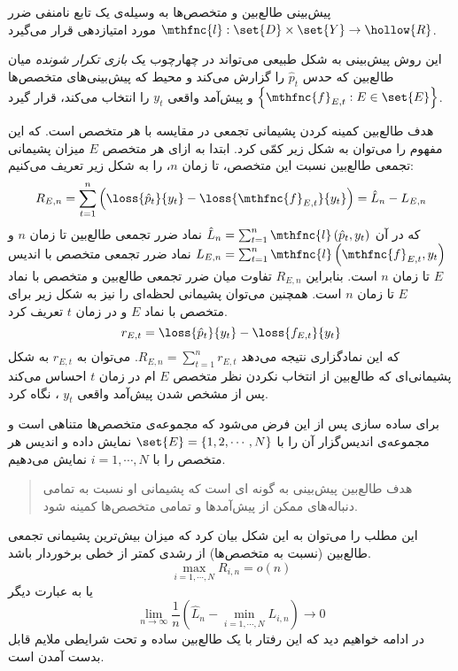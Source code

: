 
پیش‌بینی طالع‌بین و متخصص‌ها به وسیله‌ی یک تابع نامنفی ضرر
$\mthfnc{l} : \set{D} \times \set{Y} \rightarrow \hollow{R}$ 
مورد امتیازدهی قرار می‌گیرد.


این روش پیش‌بینی به شکل طبیعی می‌تواند در چهارچوب یک 
\textit{
بازی تکرار شونده
} 
میان طالع‌بین که حدس 
$\hat{p}_t$ 
را گزارش می‌کند و محیط که پیش‌بینی‌های متخصص‌ها 
$\left\lbrace \mthfnc{f}_{E,t} : E \in \set{E} \right\rbrace$ 
و پیش‌آمد واقعی 
$y_t$ 
را انتخاب می‌کند، قرار گیرد.


هدف طالع‌بین کمینه کردن پشیمانی تجمعی
در مقایسه با هر متخصص است. که این مفهوم را می‌توان به شکل زیر کمّی کرد. ابتدا به ازای هر متخصص 
$E$ 
میزان پشیمانی تجمعی طالع‌بین نسبت این متخصص، تا زمان 
$n$، 
را به شکل زیر تعریف می‌کنیم:
\[
R_{E,n} = \sum^{n}_{t = 1} \left( \loss{\hat{p}_t}{y_t} - \loss{\mthfnc{f}_{E,t}}{y_t} \right) = \hat{L}_n - L_{E,n}
\]
که در آن 
$\hat{L}_n = \sum^{n}_{t=1} \mthfnc{l} \left( \hat{p}_t, y_t \right)$ 
نماد ضرر تجمعی طالع‌بین تا زمان 
$n$ 
و 
$L_{E,n} = \sum^{n}_{t=1} \mthfnc{l} \left( \mthfnc{f}_{E,t}, y_t \right)$ 
نماد ضرر تجمعی متخصص با اندیس 
$E$ 
تا زمان 
$n$ 
است. بنابراین 
$R_{E,n}$ 
تفاوت میان ضرر تجمعی طالع‌بین و متخصص با نماد 
$E$ 
تا زمان 
$n$ 
است. همچنین می‌توان پشیمانی لحظه‌ای را نیز به شکل زیر برای متخصص با نماد 
$E$ 
و در زمان 
$t$ 
تعریف کرد.
\[
r_{E,t} = \loss{ \hat{p}_t }{ y_t } - \loss{ f_{E,t} }{ y_t }
\]
که این نمادگزاری نتیجه می‌دهد 
$R_{E,n} = \sum^{n}_{t=1} r_{E,t}$. 
می‌توان به 
$r_{E,t}$ 
به شکل پشیمانی‌ای که طالع‌بین از انتخاب نکردن نظر متخصص 
$E$
ام در زمان 
$t$ 
احساس می‌کند پس از مشخص شدن پیش‌آمد واقعی 
$y_t$ 
، نگاه کرد.


برای ساده سازی پس از این فرض می‌شود که مجموعه‌ی متخصص‌ها متناهی است و مجموعه‌ی اندیس‌گزار آن را با 
$\set{E} = \left\lbrace 1,2, \cdots, N \right\rbrace$ 
نمایش داده و اندیس هر متخصص را با 
$i = 1, \cdots, N$ 
نمایش می‌دهیم.
\begin{quote}
هدف طالع‌بین پیش‌بینی به گونه ای است که پشیمانی او نسبت به تمامی دنباله‌های ممکن از پیش‌آمدها و تمامی متخصص‌ها کمینه شود.
\end{quote}
این مطلب را می‌توان به این شکل بیان کرد که میزان بیش‌ترین پشیمانی تجمعی طالع‌بین (نسبت به متخصص‌ها) از رشدی کمتر از خطی برخوردار باشد.
\[
\max_{i = 1, \cdots, N} R_{i,n} = o(n)
\]
یا به عبارت دیگر
\[
\lim_{n \rightarrow \infty} \frac{1}{n} \left( \hat{L}_n - \min_{i = 1, \cdots, N} L_{i,n} \right) \rightarrow 0
\]
در ادامه خواهیم دید که این رفتار با یک طالع‌بین ساده و تحت شرایطی ملایم قابل بدست آمدن است.

